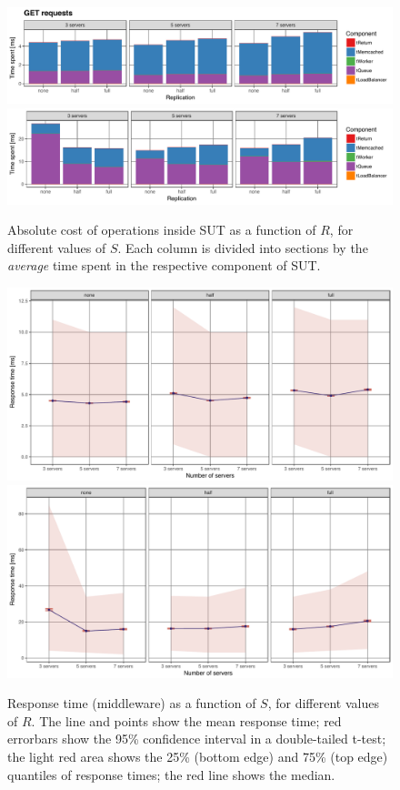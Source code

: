 \documentclass[11pt]{article}
\begin{document}
\begin{figure}[h]
\centering
\includegraphics[width=\textwidth]{../results/replication/graphs/time_breakdown_vs_replication_get_abs.pdf}
\includegraphics[width=\textwidth]{../results/replication/graphs/time_breakdown_vs_replication_set_abs.pdf}
\caption{Absolute cost of operations inside SUT as a function of $R$, for different values of $S$. Each column is divided into sections by the \emph{average} time spent in the respective component of SUT.}
\label{fig:exp2:res:breakdown}
\end{figure}

\begin{figure}[h]
\centering
\includegraphics[width=\textwidth]{../results/replication/graphs/response_time_vs_servers_get.pdf}
\includegraphics[width=\textwidth]{../results/replication/graphs/response_time_vs_servers_set.pdf}
\caption{Response time (middleware) as a function of $S$, for different values of $R$. The line and points show the mean response time; red errorbars show the 95\% confidence interval in a double-tailed t-test; the light red area shows the 25\% (bottom edge) and 75\% (top edge) quantiles of response times; the red line shows the median.}
\label{fig:exp2:res:servers}
\end{figure}
\end{document}
